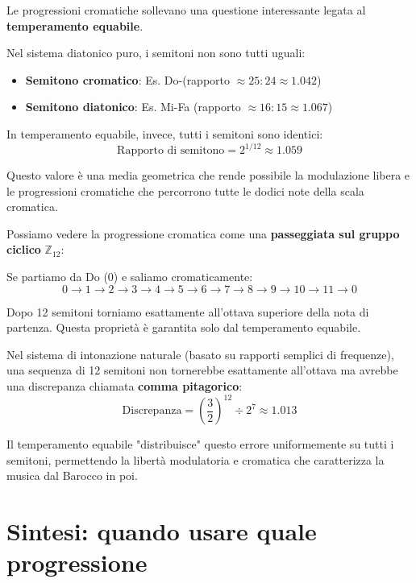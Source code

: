 \begin{matematica}
	Le progressioni cromatiche sollevano una questione interessante legata al \textbf{temperamento equabile}.
	
	Nel sistema diatonico puro, i semitoni non sono tutti uguali:
	\begin{itemize}
		\item \textbf{Semitono cromatico}: Es. Do-\Dodiesis  (rapporto $\approx 25:24 \approx 1.042$)
		\item \textbf{Semitono diatonico}: Es. Mi-Fa (rapporto $\approx 16:15 \approx 1.067$)
	\end{itemize}
	
	In temperamento equabile, invece, tutti i semitoni sono identici:
	\[
	\text{Rapporto di semitono} = 2^{1/12} \approx 1.059
	\]
	
	Questo valore è una media geometrica che rende possibile la modulazione libera e le progressioni cromatiche che percorrono tutte le dodici note della scala cromatica.
	
	Possiamo vedere la progressione cromatica come una \textbf{passeggiata sul gruppo ciclico} $\mathbb{Z}_{12}$:
	
	Se partiamo da Do (0) e saliamo cromaticamente:
	\[
	0 \rightarrow 1 \rightarrow 2 \rightarrow 3 \rightarrow 4 \rightarrow 5 \rightarrow 6 \rightarrow 7 \rightarrow 8 \rightarrow 9 \rightarrow 10 \rightarrow 11 \rightarrow 0
	\]
	
	Dopo 12 semitoni torniamo esattamente all'ottava superiore della nota di partenza. Questa proprietà è garantita solo dal temperamento equabile.
	
	Nel sistema di intonazione naturale (basato su rapporti semplici di frequenze), una sequenza di 12 semitoni non tornerebbe esattamente all'ottava ma avrebbe una discrepanza chiamata \textbf{comma pitagorico}:
	\[
	\text{Discrepanza} = \left(\frac{3}{2}\right)^{12} \div 2^7 \approx 1.013
	\]
	
	Il temperamento equabile "distribuisce" questo errore uniformemente su tutti i semitoni, permettendo la libertà modulatoria e cromatica che caratterizza la musica dal Barocco in poi.
\end{matematica}

\section{Sintesi: quando usare quale progressione}
\label{sec:sintesi_progressioni}


